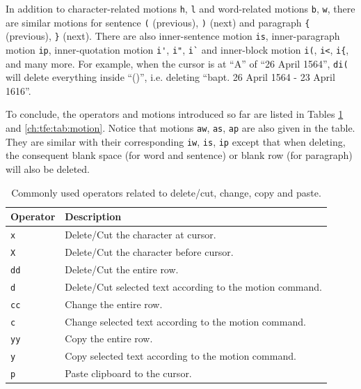 In addition to character-related motions \verb|h|, \verb|l| and word-related motions  \verb|b|, \verb|w|, there are similar motions for sentence \verb|(| (previous), \verb|)| (next) and paragraph \verb|{| (previous), \verb|}| (next). There are also inner-sentence motion \verb|is|, inner-paragraph motion \verb|ip|, inner-quotation motion \verb|i'|, \verb|i"|, \verb|i`| and inner-block motion \verb|i(|, \verb|i<|, \verb|i{|, and many more. For example, when the cursor is at ``A'' of ``26 April 1564'', \verb|di(| will delete everything inside ``()'', i.e. deleting ``bapt. 26 April 1564 - 23 April 1616''.

To conclude, the operators and motions introduced so far are listed in Tables \ref{ch:tfe:tab:deletecut} and \ref{ch:tfe:tab:motion}. Notice that motions \verb|aw|, \verb|as|, \verb|ap| are also given in the table. They are similar with their corresponding \verb|iw|, \verb|is|, \verb|ip| except that when deleting, the consequent blank space (for word and sentence) or blank row (for paragraph) will also be deleted.

\begin{table}
  \centering \caption{Commonly used operators related to delete/cut, change, copy and paste.}\label{ch:tfe:tab:deletecut}
  \begin{tabularx}{\textwidth}{lX}
    \hline
    Operator & Description \\ \hline
    \verb|x| & Delete/Cut the character at cursor. \\ \hdashline
    \verb|X| & Delete/Cut the character before cursor. \\ \hdashline
    \verb|dd| & Delete/Cut the entire row. \\ \hdashline
    \verb|d| & Delete/Cut selected text according to the motion command. \\ \hdashline
    \verb|cc| & Change the entire row. \\ \hdashline
    \verb|c| & Change selected text according to the motion command. \\ \hdashline
    \verb|yy| & Copy the entire row. \\ \hdashline
    \verb|y| & Copy selected text according to the motion command. \\ \hdashline
    \verb|p| & Paste clipboard to the cursor. \\
    \hline
  \end{tabularx}
\end{table}

